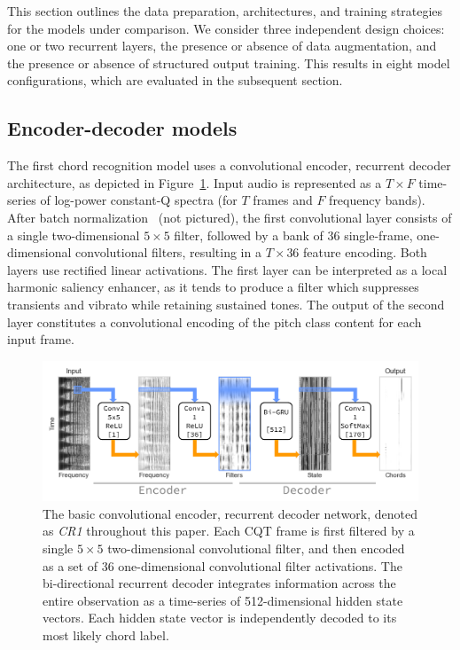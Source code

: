 \documentclass{article}
\begin{document}

This section outlines the data preparation, architectures, and training strategies for the models under comparison.
We consider three independent design choices: one or two recurrent layers, the presence or absence of data augmentation, and the presence or absence of structured output training.
This results in eight model configurations, which are evaluated in the subsequent section.

\subsection{Encoder-decoder models}


The first chord recognition model uses a convolutional encoder, recurrent decoder architecture, as depicted in Figure~\ref{fig:crnn1}.
Input audio is represented as a $T\times F$ time-series of log-power constant-Q spectra (for $T$ frames and $F$ frequency bands).
After batch normalization~\cite{ioffe2015batch} (not pictured), the first convolutional layer consists of a single two-dimensional $5\times5$ filter, followed by a bank of $36$ single-frame, one-dimensional convolutional filters, resulting in a $T\times 36$ feature encoding.
Both layers use rectified linear activations.
The first layer can be interpreted as a local harmonic saliency enhancer, as it tends to produce a filter which suppresses transients and vibrato while retaining sustained tones.
The output of the second layer constitutes a convolutional encoding of the pitch class content for each input frame.

\begin{figure}
    \centering
    \includegraphics[width=\columnwidth]{crnn1}
    \caption{The basic convolutional encoder, recurrent decoder network, denoted as \emph{CR1} throughout this paper.
            Each CQT frame is first filtered by a single $5\times 5$ two-dimensional convolutional filter, and then encoded as a set of 36 one-dimensional convolutional filter activations.
            The bi-directional recurrent decoder integrates information across the entire observation as a time-series of 512-dimensional hidden state vectors. 
            Each hidden state vector is independently decoded to its most likely chord label.\label{fig:crnn1}}
\end{figure}
\end{document}
